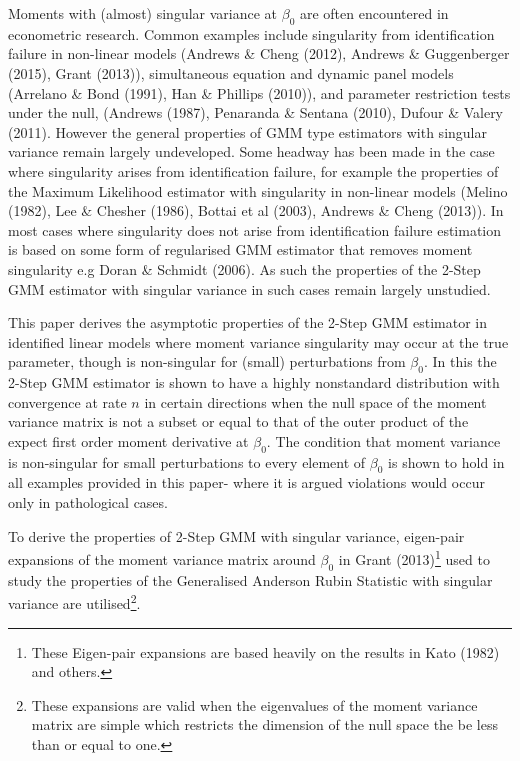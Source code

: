 \documentclass[11pt, fleqn]{article}
\begin{document}
Moments with  (almost) singular variance at $\beta_0$ are often encountered in econometric research. Common examples include singularity from identification failure in non-linear models (Andrews \& Cheng (2012), Andrews \& Guggenberger (2015), Grant (2013)),  simultaneous equation  and dynamic  panel models  (Arrelano \& Bond (1991), Han \& Phillips (2010)), and  parameter restriction tests under the null, (Andrews (1987), Penaranda \& Sentana (2010), Dufour \& Valery (2011). However the general properties of GMM type estimators with singular variance remain largely undeveloped. Some headway has been made in the case where  singularity arises from identification failure, for example the properties of the Maximum Likelihood estimator with singularity in non-linear models (Melino (1982), Lee \& Chesher (1986), Bottai et al (2003), Andrews \& Cheng (2013)). In most cases where singularity does not arise from identification failure estimation is based on some form of regularised  GMM estimator that removes moment singularity e.g Doran \& Schmidt (2006).  As such the properties of the 2-Step GMM estimator with singular variance  in such cases remain largely unstudied.


This paper derives the asymptotic properties of the 2-Step GMM estimator in identified linear models where moment variance singularity may occur at the true parameter, though is non-singular for (small) perturbations from $\beta_0$. In this the 2-Step GMM estimator is shown to have a highly nonstandard distribution with convergence at rate $n$ in certain directions when the null space of the moment variance matrix is not a subset or equal to that of the outer product of the expect first order moment derivative  at $\beta_0$. The condition that moment variance is non-singular for small perturbations to every element of $\beta_0$ is shown to hold in all examples provided in this paper- where it is argued violations would occur only in pathological cases.

To derive the properties of 2-Step GMM with singular variance, eigen-pair expansions of the moment variance matrix  around $\beta_0$ in Grant (2013)\footnote{ These Eigen-pair expansions are based heavily on the results  in Kato (1982) and others.} used to study the properties of the Generalised Anderson Rubin Statistic with singular variance are utilised\footnote{These
expansions are valid when the eigenvalues of the moment variance matrix are simple which restricts the  dimension of the null space the be less than or equal to one.}.
\end{document}

